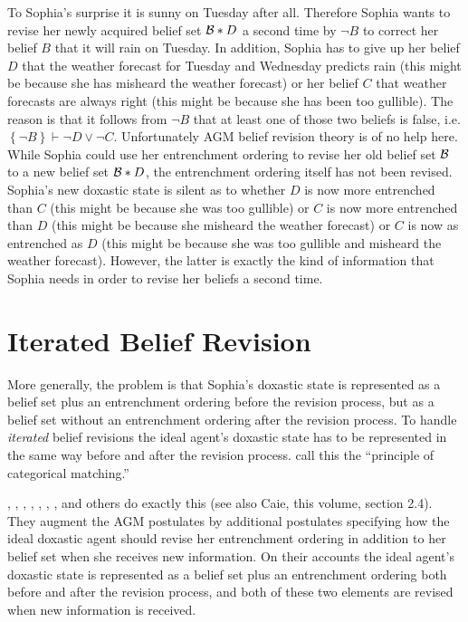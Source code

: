 To Sophia's surprise it is sunny on Tuesday after all. Therefore Sophia wants to revise her newly acquired belief set $\begin{cal}B\end{cal}*D$ a second time by $\neg B$ to correct her belief $B$ that it will rain on Tuesday. In addition, Sophia has to give up her belief $D$ that the weather forecast for Tuesday and Wednesday predicts rain (this might be because she has misheard the weather forecast) or her belief $C$ that weather forecasts are always right (this might be because she has been too gullible). The reason is that it follows from $\neg B$ that at least one of those two beliefs is false, i.e. $\left\{\neg B\right\}\vdash\neg D\vee\neg C$. Unfortunately AGM belief revision theory is of no help here. While Sophia could use her entrenchment ordering to revise her old belief set $\cal B$ to a new belief set $\begin{cal}B\end{cal}*D$, the entrenchment ordering itself has not been revised. Sophia's new doxastic state is silent as to whether $D$ is now more entrenched than $C$ (this might be because she was too gullible) or $C$ is now more entrenched than $D$ (this might be because she misheard the weather forecast) or $C$ is now as entrenched as $D$ (this might be because she was too gullible and misheard the weather forecast). However, the latter is exactly the kind of information that Sophia needs in order to revise her beliefs a second time.


\section{Iterated Belief Revision}

More generally, the problem is that Sophia's doxastic state is represented as a belief set plus an entrenchment ordering before the revision process, but as a belief set without an entrenchment ordering after the revision process. To handle \emph{iterated} belief revisions the ideal agent's doxastic state has to be represented in the same way before and after the revision process. \citet[37]{gr95} call this the ``principle of categorical matching.''

\citet{n94}, \citet{b96}, \citet{dp97}, \citet{s98}, \citet{f00}, \citet{r03}, \citet{r06}, and others do exactly this (see also Caie, this volume, section 2.4). They augment the AGM postulates by additional postulates specifying how the ideal doxastic agent should revise her entrenchment ordering in addition to her belief set when she receives new information. On their accounts the ideal agent's doxastic state is represented as a belief set plus an entrenchment ordering both before and after the revision process, and both of these two elements are revised when new information is received.

